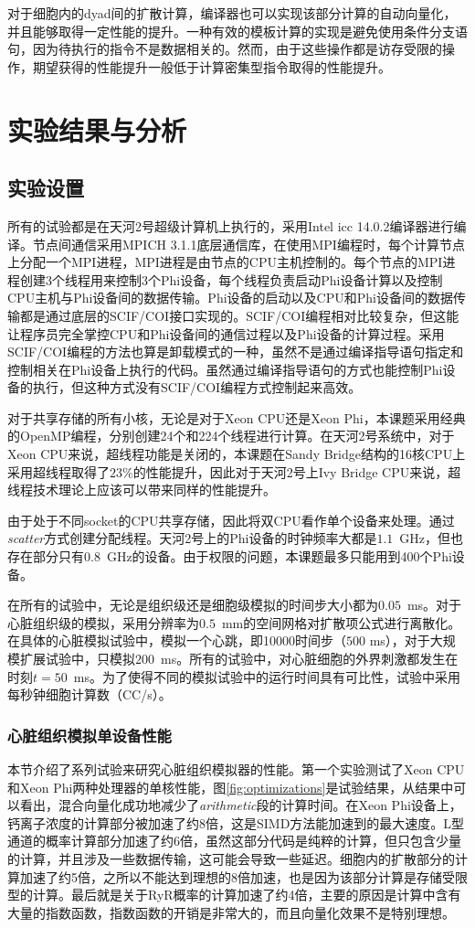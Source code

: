 对于细胞内的dyad间的扩散计算，编译器也可以实现该部分计算的自动向量化，并且能够取得一定性能的提升。一种有效的模板计算的实现是避免使用条件分支语句，因为待执行的指令不是数据相关的。然而，由于这些操作都是访存受限的操作，期望获得的性能提升一般低于计算密集型指令取得的性能提升。

\section{实验结果与分析}
\subsection{实验设置}
所有的试验都是在天河2号超级计算机上执行的，采用Intel icc 14.0.2编译器进行编译。节点间通信采用MPICH 3.1.1底层通信库，在使用MPI编程时，每个计算节点上分配一个MPI进程，MPI进程是由节点的CPU主机控制的。每个节点的MPI进程创建3个线程用来控制3个Phi设备，每个线程负责启动Phi设备计算以及控制CPU主机与Phi设备间的数据传输。Phi设备的启动以及CPU和Phi设备间的数据传输都是通过底层的SCIF/COI接口实现的。SCIF/COI编程相对比较复杂，但这能让程序员完全掌控CPU和Phi设备间的通信过程以及Phi设备的计算过程。采用SCIF/COI编程的方法也算是卸载模式的一种，虽然不是通过编译指导语句指定和控制相关在Phi设备上执行的代码。虽然通过编译指导语句的方式也能控制Phi设备的执行，但这种方式没有SCIF/COI编程方式控制起来高效。

对于共享存储的所有小核，无论是对于Xeon CPU还是Xeon Phi，本课题采用经典的OpenMP编程，分别创建24个和224个线程进行计算。在天河2号系统中，对于Xeon CPU来说，超线程功能是关闭的，本课题在Sandy Bridge结构的16核CPU上采用超线程取得了$23\%$的性能提升，因此对于天河2号上Ivy Bridge CPU来说，超线程技术理论上应该可以带来同样的性能提升。

由于处于不同socket的CPU共享存储，因此将双CPU看作单个设备来处理。通过\textit{scatter}方式创建分配线程。天河2号上的Phi设备的时钟频率大都是$1.1$~GHz，但也存在部分只有$0.8$~GHz的设备。由于权限的问题，本课题最多只能用到400个Phi设备。

在所有的试验中，无论是组织级还是细胞级模拟的时间步大小都为$0.05$~ms。对于心脏组织级的模拟，采用分辨率为$0.5$~mm的空间网格对扩散项公式进行离散化。在具体的心脏模拟试验中，模拟一个心跳，即10000时间步（$500$ ms），对于大规模扩展试验中，只模拟$200$~ms。所有的试验中，对心脏细胞的外界刺激都发生在时刻$t=50$~ms。为了使得不同的模拟试验中的运行时间具有可比性，试验中采用每秒钟细胞计算数（CC/s）。

\subsubsection{心脏组织模拟单设备性能}
本节介绍了系列试验来研究心脏组织模拟器的性能。第一个实验测试了Xeon CPU和Xeon Phi两种处理器的单核性能，图\ref{fig:optimizations}是试验结果，从结果中可以看出，混合向量化成功地减少了\textit{arithmetic}段的计算时间。在Xeon Phi设备上，钙离子浓度的计算部分被加速了约8倍，这是SIMD方法能加速到的最大速度。L型通道的概率计算部分加速了约6倍，虽然这部分代码是纯粹的计算，但只包含少量的计算，并且涉及一些数据传输，这可能会导致一些延迟。细胞内的扩散部分的计算加速了约5倍，之所以不能达到理想的8倍加速，也是因为该部分计算是存储受限型的计算。最后就是关于RyR概率的计算加速了约4倍，主要的原因是计算中含有大量的指数函数，指数函数的开销是非常大的，而且向量化效果不是特别理想。

